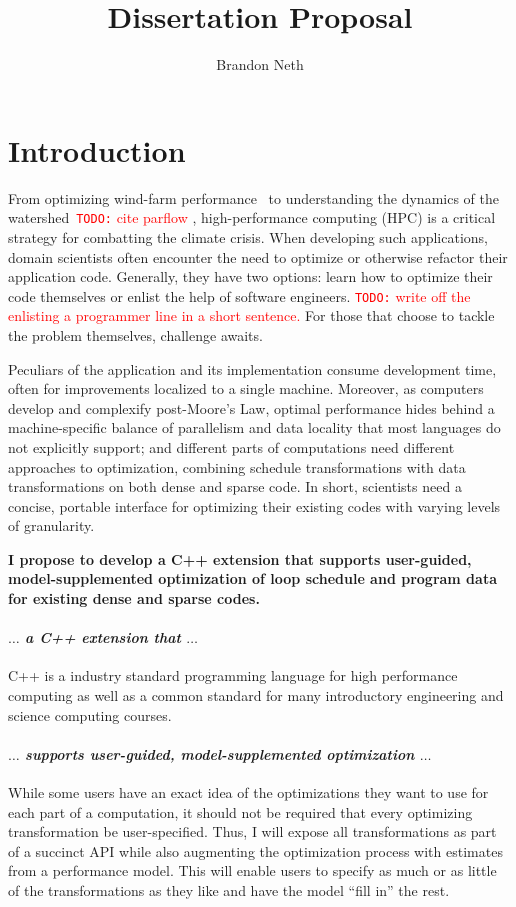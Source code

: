 \documentclass{article}
\author{Brandon Neth}
\title{Dissertation Proposal}
\newcommand{\todo}[1]{{\textcolor{red}{{\tt{TODO:}}\,\,#1 }}}
\begin{document}
\maketitle

\section{Introduction}
From optimizing wind-farm performance~\cite{sprague2020exawind} to understanding the dynamics of the watershed~\cite{olschanowsky2019hydroframe}\todo{cite parflow},
high-performance computing (HPC) is a critical strategy for combatting the climate crisis. 
When developing such applications, domain scientists often encounter the need to optimize or otherwise refactor their application code. 
Generally, they have two options: learn how to optimize their code themselves or enlist the help of software engineers. 
\todo{write off the enlisting a programmer line in a short sentence.} 
For those that choose to tackle the problem themselves, challenge awaits. 

Peculiars of the application and its implementation consume development time, often for improvements localized to a single machine. 
Moreover, as computers develop and complexify post-Moore's Law, optimal performance hides behind a machine-specific balance of parallelism and data locality that most languages do not explicitly support; and 
different parts of computations need different approaches to optimization, combining schedule transformations with data transformations on both dense and sparse code.
In short, scientists need a concise, portable interface for optimizing their existing codes with varying levels of granularity.

\textbf{I propose to develop a C++ extension that supports user-guided, model-supplemented optimization of loop schedule and program data for existing dense and sparse codes.}
\paragraph{$\dots$ \textit{a C++ extension that} $\dots$}
C++ is a industry standard programming language for high performance computing as well as a common standard for many introductory engineering and science computing courses.

\paragraph{$\dots$ \textit{supports user-guided, model-supplemented optimization} $\dots$}
While some users have an exact idea of the optimizations they want to use for each part of a computation, it should not be required that every optimizing transformation be user-specified. 
Thus, I will expose all transformations as part of a succinct API while also augmenting the optimization process with estimates from a performance model. 
This will enable users to specify as much or as little of the transformations as they like and have the model \enquote{fill in} the rest.
\end{document}
